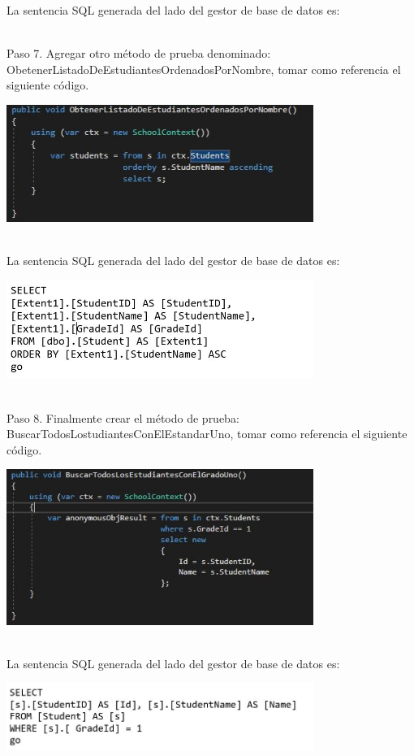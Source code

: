 La sentencia SQL generada del lado del gestor de base de datos es: 


\textbf{}\\

Paso 7. Agregar otro método de prueba denominado: ObetenerListadoDeEstudiantesOrdenadosPorNombre, tomar
como referencia el siguiente código.

\begin{center}
	\includegraphics[width=10cm]{./Imagenes/Captura6} 
	\end{center}
\textbf{}\\

La sentencia SQL generada del lado del gestor de base de datos es: 

\begin{center}
	\includegraphics[width=10cm]{./Imagenes/U1-4} 
	\end{center}
\textbf{}\\

Paso 8. Finalmente crear el método de prueba: BuscarTodosLostudiantesConElEstandarUno, tomar como
referencia el siguiente código.

\begin{center}
	\includegraphics[width=10cm]{./Imagenes/Captura7} 
	\end{center}
\textbf{}\\

La sentencia SQL generada del lado del gestor de base de datos es: 

\begin{center}
	\includegraphics[width=10cm]{./Imagenes/U1-5} 
	\end{center}
\textbf{}\\

\textbf{}\\
